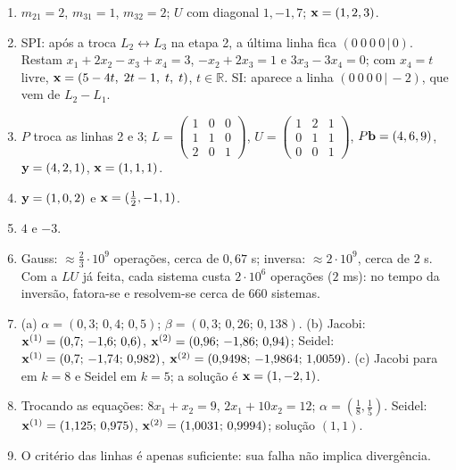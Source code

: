\begin{enumerate}[label=\textbf{\arabic*.},leftmargin=*,nosep]
\item $m_{21}=2$, $m_{31}=1$, $m_{32}=2$; $U$ com diagonal $1,-1,7$; $\mathbf{x}=(1,2,3)$.
\item SPI: após a troca $L_2\leftrightarrow L_3$ na etapa 2, a última linha fica
  $(0\ 0\ 0\ 0\,|\,0)$. Restam $x_1+2x_2-x_3+x_4=3$, $-x_2+2x_3=1$ e $3x_3-3x_4=0$; com
  $x_4=t$ livre, $\mathbf{x}=(5-4t,\;2t-1,\;t,\;t)$, $t\in\mathbb R$. SI: aparece a linha
  $(0\ 0\ 0\ 0\,|\,-2)$, que vem de $L_2-L_1$.
\item $P$ troca as linhas 2 e 3; $L=\left(\begin{smallmatrix}1&0&0\\1&1&0\\2&0&1\end{smallmatrix}\right)$,
  $U=\left(\begin{smallmatrix}1&2&1\\0&1&1\\0&0&1\end{smallmatrix}\right)$, $P\mathbf{b}=(4,6,9)$,
  $\mathbf{y}=(4,2,1)$, $\mathbf{x}=(1,1,1)$.
\item $\mathbf{y}=(1,0,2)$ e $\mathbf{x}=(\tfrac12,-1,1)$.
\item $4$ e $-3$.
\item Gauss: $\approx\frac23\cdot10^9$ operações, cerca de $0{,}67$ s; inversa: $\approx2\cdot10^9$, cerca de $2$ s.
  Com a $LU$ já feita, cada sistema custa $2\cdot10^{6}$ operações ($2$ ms): no tempo da
  inversão, fatora-se e resolvem-se cerca de $660$ sistemas.
\item (a) $\alpha=(0{,}3;\,0{,}4;\,0{,}5)$; $\beta=(0{,}3;\,0{,}26;\,0{,}138)$. (b) Jacobi:
  $\mathbf{x}^{(1)}=(0{,}7;\,-1{,}6;\,0{,}6)$, $\mathbf{x}^{(2)}=(0{,}96;\,-1{,}86;\,0{,}94)$; Seidel:
  $\mathbf{x}^{(1)}=(0{,}7;\,-1{,}74;\,0{,}982)$, $\mathbf{x}^{(2)}=(0{,}9498;\,-1{,}9864;\,1{,}0059)$.
  (c) Jacobi para em $k=8$ e Seidel em $k=5$; a solução é $\mathbf{x}=(1,-2,1)$.
\item Trocando as equações: $8x_1+x_2=9$, $2x_1+10x_2=12$; $\alpha=(\tfrac18,\tfrac15)$.
  Seidel: $\mathbf{x}^{(1)}=(1{,}125;\,0{,}975)$, $\mathbf{x}^{(2)}=(1{,}0031;\,0{,}9994)$; solução $(1,1)$.
\item O critério das linhas é apenas suficiente: sua falha não implica divergência.
\end{enumerate}
